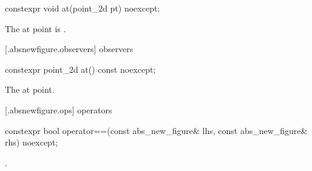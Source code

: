 %
\begin{itemdecl}
constexpr void at(point_2d pt) noexcept;
\end{itemdecl}
\begin{itemdescr}
\pnum
\effects
The at point is .
\end{itemdescr}

 [\iotwod.absnewfigure.observers]{ observers}%

%
\begin{itemdecl}
constexpr point_2d at() const noexcept;
\end{itemdecl}
\begin{itemdescr}
\pnum
\returns
The at point.
\end{itemdescr}

 [\iotwod.absnewfigure.ops]{ operators}%

%
\begin{itemdecl}
constexpr bool operator==(const abs_new_figure& lhs, const abs_new_figure& rhs) 
  noexcept;
\end{itemdecl}
\begin{itemdescr}
\pnum
\returns
{}.
\end{itemdescr}
